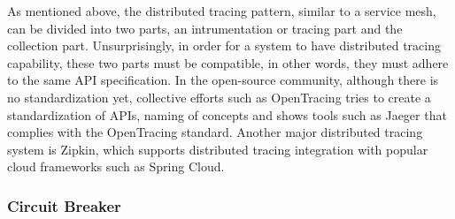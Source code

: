 \documentclass{Configuration_Files/PoliMi3i_thesis}
\begin{document}

As mentioned above, the distributed tracing pattern, similar to a service mesh, can be divided into two parts, an intrumentation or tracing part and the collection part.
Unsurprisingly, in order for a system to have distributed tracing capability, these two parts must be compatible, in other words, they must adhere to the same API specification.
In the open-source community, although there is no standardization yet, collective efforts such as OpenTracing tries to create a standardization of APIs, naming of concepts and shows tools such as Jaeger that complies with the OpenTracing standard.
Another major distributed tracing system is Zipkin, which supports distributed tracing integration with popular cloud frameworks such as Spring Cloud.

\subsubsection{Circuit Breaker}
\label{subsubsec:circuit_breaker}
\end{document}
